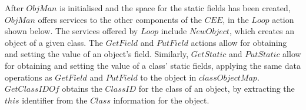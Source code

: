 
After $ObjMan$ is initialised and the space for the static fields has
been created, $ObjMan$ offers services to the other components of the
$CEE$, in the $Loop$ action shown below.
The services offered by $Loop$ include $NewObject$, which creates an
object of a given class.
The $GetField$ and $PutField$ actions allow for obtaining and setting
the value of an object's field.
Similarly, $GetStatic$ and $PutStatic$ allow for obtaining and setting
the value of a class' static fields, applying the same data operations
as $GetField$ and $PutField$ to the object in $classObjectMap$.
$GetClassIDOf$ obtains the $ClassID$ for the class of an object, by
extracting the $this$ identifier from the $Class$ information for the
object.

